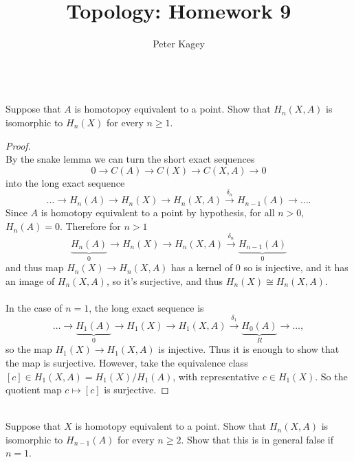 \documentclass{article}
\newenvironment{problem}[2][Problem]{\begin{trivlist}
\item[\hskip \labelsep {\bfseries #1}\hskip \labelsep {\bfseries #2.}]}{\end{trivlist}}
\newcommand{\ra}{\rightarrow}
\begin{document}
\title{Topology: Homework 9}
\author{Peter Kagey}

\maketitle

\begin{problem}{1} \text{} \\
  Suppose that $A$ is homotopoy equivalent to a point. Show that $H_n(X,A)$
  is isomorphic to $H_n(X)$ for every $n \geq 1$.
\end{problem}

\begin{proof} \text{} \\
  By the snake lemma we can turn the short exact sequences \[
    0 \ra C(A) \ra C(X) \ra C(X,A) \ra 0
  \] into the long exact sequence \[
    \hdots \ra H_n(A) \ra H_n(X) \ra H_n(X,A) \xrightarrow{\delta_n} H_{n-1}(A) \ra \hdots.
  \]
  Since $A$ is homotopy equivalent to a point by hypothesis, for all $n > 0$,
  $H_n(A) = 0$.
  Therefore for $n > 1$ \[
    \underbrace{H_n(A)}_0 \ra H_n(X) \ra H_n(X,A) \xrightarrow{\delta_n} \underbrace{H_{n-1}(A)}_0
  \] and thus map $H_n(X) \ra H_n(X,A)$ has a kernel of $0$ so is injective, and it
  has an image of $H_n(X,A)$, so it's surjective, and thus $H_n(X) \cong H_n(X,A)$.
  \\~\\
  In the case of $n = 1$, the long exact sequence is \[
    \hdots \ra
    \underbrace{H_1(A)}_0 \ra H_1(X) \ra H_1(X,A) \xrightarrow{\delta_1} \underbrace{H_0(A)}_R \ra \hdots,
  \]
  so the map $H_1(X) \rightarrow H_1(X, A)$ is injective. Thus it is enough to
  show that the map is surjective. However, take the equivalence class
  $[c] \in H_1(X, A) = H_1(X)/H_1(A)$, with representative $c \in H_1(X)$.
  So the quotient map $c \mapsto [c]$ is surjective.
\end{proof}
\pagebreak
\begin{problem}{2} \text{} \\
  Suppose that $X$ is homotopy equivalent to a point. Show that $H_n(X,A)$ is
  isomorphic to $H_{n-1}(A)$ for every $n \geq 2$. Show that this is in general
  false if $n = 1$.
\end{problem}
\end{document}
